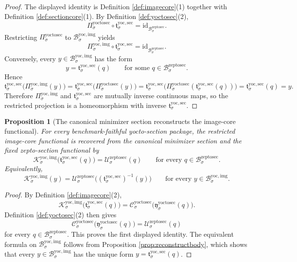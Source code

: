 \documentclass[11pt]{article}
\newcommand{\ZeptoSectionBody}[1]{\mathcal B_{#1}^{\mathrm{zeptosec}}}
\newcommand{\ZeptoSectionFunctional}[1]{\mathscr U_{#1}^{\mathrm{zeptosec}}}
\newcommand{\YoctoSectionProj}[1]{\Pi_{#1}^{\mathrm{yoctosec}}}
\newcommand{\YoctoSectionZeptoMin}[1]{\mathfrak y_{#1}^{\mathrm{yoctosec}}}
\newcommand{\YoctoSectionFunctional}[1]{\mathscr C_{#1}^{\mathrm{yoctosec}}}
\newcommand{\YoctoImgBody}[1]{\mathcal B_{#1}^{\mathrm{yoc,img}}}
\newcommand{\YoctoImgProj}[1]{\Pi_{#1}^{\mathrm{yoc,img}}}
\newcommand{\YoctoImgFunctional}[1]{\mathscr K_{#1}^{\mathrm{yoc,img}}}
\newcommand{\YoctoMinSection}[1]{\mathfrak t_{#1}^{\mathrm{yoc,sec}}}
\newtheorem{proposition}{Proposition}
\begin{document}
\begin{proof}
The displayed identity is Definition \ref{def:imagecore}(1) together with Definition \ref{def:sectioncore}(1). By Definition \ref{def:yoctosec}(2),
\[
\YoctoSectionProj{\sigma}\circ\YoctoMinSection{\sigma}
=
\mathrm{id}_{\ZeptoSectionBody{\sigma}}.
\]
Restricting \(\YoctoSectionProj{\sigma}\) to \(\YoctoImgBody{\sigma}\) yields
\[
\YoctoImgProj{\sigma}\circ\YoctoMinSection{\sigma}
=
\mathrm{id}_{\ZeptoSectionBody{\sigma}}.
\]
Conversely, every \(y\in\YoctoImgBody{\sigma}\) has the form
\[
y=\YoctoMinSection{\sigma}(q)
\qquad
\text{for some }
q\in\ZeptoSectionBody{\sigma}.
\]
Hence
\[
\YoctoMinSection{\sigma}\bigl(\YoctoImgProj{\sigma}(y)\bigr)
=
\YoctoMinSection{\sigma}\bigl(\YoctoSectionProj{\sigma}(y)\bigr)
=
\YoctoMinSection{\sigma}\bigl(\YoctoSectionProj{\sigma}(\YoctoMinSection{\sigma}(q))\bigr)
=
\YoctoMinSection{\sigma}(q)
=
y.
\]
Therefore \(\YoctoImgProj{\sigma}\) and \(\YoctoMinSection{\sigma}\) are mutually inverse continuous maps, so the restricted projection is a homeomorphism with inverse \(\YoctoMinSection{\sigma}\).
\end{proof}

\begin{proposition}[The canonical minimizer section reconstructs the image-core functional]
\label{prop:reconstructfunctional}
For every benchmark-faithful yocto-section package, the restricted image-core functional is recovered from the canonical minimizer section and the fixed zepto-section functional by
\[
\YoctoImgFunctional{\sigma}\bigl(\YoctoMinSection{\sigma}(q)\bigr)
=
\ZeptoSectionFunctional{\sigma}(q)
\qquad
\text{for every }q\in\ZeptoSectionBody{\sigma}.
\]
Equivalently,
\[
\YoctoImgFunctional{\sigma}(y)
=
\ZeptoSectionFunctional{\sigma}\bigl((\YoctoMinSection{\sigma})^{-1}(y)\bigr)
\qquad
\text{for every }y\in\YoctoImgBody{\sigma}.
\]
\end{proposition}

\begin{proof}
By Definition \ref{def:imagecore}(2),
\[
\YoctoImgFunctional{\sigma}\bigl(\YoctoMinSection{\sigma}(q)\bigr)
=
\YoctoSectionFunctional{\sigma}\bigl(\YoctoSectionZeptoMin{\sigma}(q)\bigr).
\]
Definition \ref{def:yoctosec}(2) then gives
\[
\YoctoSectionFunctional{\sigma}\bigl(\YoctoSectionZeptoMin{\sigma}(q)\bigr)
=
\ZeptoSectionFunctional{\sigma}(q)
\]
for every \(q\in\ZeptoSectionBody{\sigma}\). This proves the first displayed identity. The equivalent formula on \(\YoctoImgBody{\sigma}\) follows from Proposition \ref{prop:reconstructbody}, which shows that every \(y\in\YoctoImgBody{\sigma}\) has the unique form \(y=\YoctoMinSection{\sigma}(q)\).
\end{proof}
\end{document}
